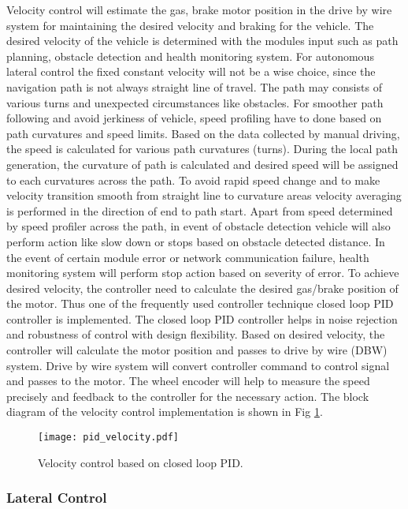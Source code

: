 \documentclass[10 pt,letterpaper,conference]{IEEEtran}
\begin{document}
Velocity control will estimate the gas, brake motor position in the
drive by wire system for maintaining the desired velocity and braking
for the vehicle. The desired velocity of the vehicle is determined with
the modules input such as path planning, obstacle detection and health
monitoring system. For autonomous lateral control the fixed constant
velocity will not be a wise choice, since the navigation path is not
always straight line of travel. The path may consists of various turns
and unexpected circumstances like obstacles. For smoother path following
and avoid jerkiness of vehicle, speed profiling have to done based on
path curvatures and speed limits. Based on the data collected by manual
driving, the speed is calculated for various path curvatures (turns).
During the local path generation, the curvature of path is calculated
and desired speed will be assigned to each curvatures across the path.
To avoid rapid speed change and to make velocity transition smooth from
straight line to curvature areas velocity averaging is performed in the
direction of end to path start. Apart from speed determined by speed
profiler across the path, in event of obstacle detection vehicle will
also perform action like slow down or stops based on obstacle detected
distance. In the event of certain module error or network communication
failure, health monitoring system will perform stop action based on
severity of error. To achieve desired velocity, the controller need to
calculate the desired gas/brake position of the motor. Thus one of the
frequently used controller technique closed loop PID controller is
implemented. The closed loop PID controller helps in noise rejection and
robustness of control with design flexibility. Based on desired
velocity, the controller will calculate the motor position and passes to
drive by wire (DBW) system. Drive by wire system will convert controller
command to control signal and passes to the motor. The wheel encoder
will help to measure the speed precisely and feedback to the controller
for the necessary action. The block diagram of the velocity control
implementation is shown in Fig \ref{fig_vel_control}.

\begin{figure}[!t]
\centering
\texttt{[image: pid\_velocity.pdf]}
\caption{Velocity control based on closed loop PID.}
\label{fig_vel_control}
\end{figure}

\subsubsection{Lateral Control}\label{lateral-control}
\end{document}
